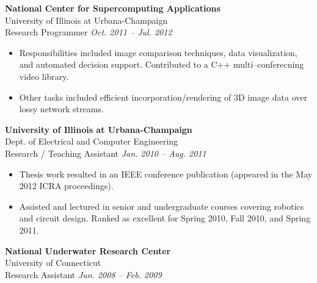 \documentclass{article}
\begin{document}
{\begin{multicols}{2}
\begin{itemize}
    \end{itemize}
    \vspace{10px}
    \textbf{National Center for Supercomputing Applications}\\
    University of Illinois at Urbana-Champaign\\
    Research Programmer \hfill \textsl{Oct. 2011 -- Jul. 2012}\\
    \vspace{ -10px}
    \begin{itemize}[noitemsep,nolistsep]
        \item Responsibilities included image comparison techniques, data visualization, and automated decision support. Contributed to a C++ multi--conferecning video library.  
        \item Other tasks included efficient incorporation/rendering of 3D image data over lossy network streams.  
    \end{itemize}
    \vspace{10px}
    \textbf{University of Illinois at Urbana-Champaign}\\ 
    Dept. of Electrical and Computer Engineering\\
    Research / Teaching Assistant \hfill \textsl{Jan. 2010 -- Aug. 2011} \\
    \vspace{ -10px}
    \begin{itemize}[noitemsep,nolistsep]
	 \item Thesis work resulted in an IEEE conference publication (appeared in the May 2012 ICRA proceedings).  
        \item Assisted and lectured in senior and undergraduate courses covering robotics and circuit design. Ranked as excellent for Spring 2010, Fall 2010, and Spring 2011.
    \end{itemize}
    \vspace{10px}
    \vfill\null
    \columnbreak
    \textbf{National Underwater Research Center}\\ \hfill 
	University of Connecticut\\ 
	Research Assistant \hfill \textsl{Jun. 2008 -- Feb. 2009} \\

\end{multicols}}
\end{document}
